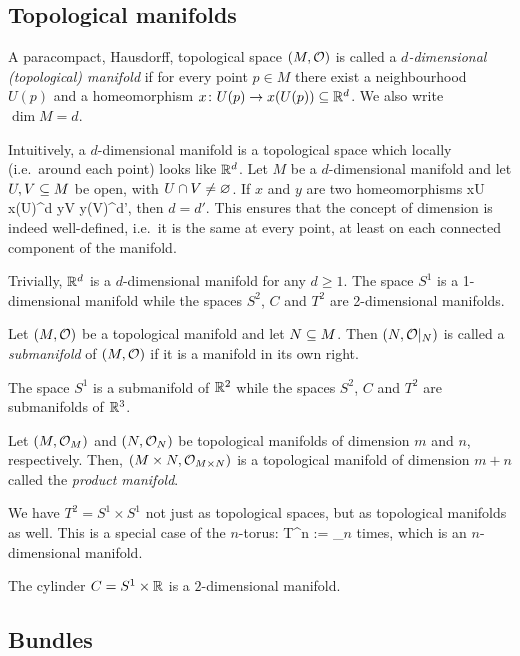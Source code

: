 \subsection{Topological manifolds}

\bd
A paracompact, Hausdorff, topological space $(M,\mathcal{O})$ is called a \emph{$d$-dimensional (topological) manifold} if for every point $p\in M$ there exist a neighbourhood $U(p)$ and a homeomorphism $x\colon U(p) \to x(U(p)) \subseteq \mathbb{R}^d$. We also write $\dim M = d$.
\ed

Intuitively, a $d$-dimensional manifold is a topological space which locally (i.e.\ around each point) looks like $\mathbb{R}^d$.
\bp
Let $M$ be a $d$-dimensional manifold and let $U,V\subseteq M$ be open, with $U\cap V \neq \varnothing$. If $x$ and $y$ are two homeomorphisms
\bse
x\cl U \to x(U)\se \R^d \qquad {}\qquad y\cl V \to y(V)\se\R^{d'},
\ese
then $d=d'$.
\ep
This ensures that the concept of dimension is indeed well-defined, i.e.\ it is the same at every point, at least on each connected component of the manifold.

\be
Trivially, $\mathbb{R}^d$ is a $d$-dimensional manifold for any $d \geq 1$. The space $S^1$ is a 1-dimensional manifold while the spaces $S^2$, $C$ and $T^2$ are 2-dimensional manifolds.
\ee

\bd
Let $(M,\mathcal{O})$ be a topological manifold and let $N \subseteq M$. Then $(N,\mathcal{O}|_N)$ is called a \emph{submanifold} of $(M,\mathcal{O})$ if it is a manifold in its own right.
\ed

\be
The space $S^1$ is a submanifold of $\mathbb{R}^2$ while the spaces $S^2$, $C$ and $T^2$ are submanifolds of $\mathbb{R}^3$. 
\ee

\bd
Let $(M,\mathcal{O}_M)$ and $(N,\mathcal{O}_N)$ be topological manifolds of dimension $m$ and $n$, respectively. Then, $(M\times N,\mathcal{O}_{M\times N})$ is a topological manifold of dimension $m+n$ called the \emph{product manifold}.
\ed

\be
We have $T^2=S^1\times S^1$ not just as topological spaces, but as topological manifolds as well. This is a special case of the $n$-torus:
\bse
T^n := _{\t{$n$ times}},
\ese
which is an $n$-dimensional manifold.
\ee

\be
The cylinder $C=S^1\times \mathbb{R}$ is a $2$-dimensional manifold.
\ee

\subsection{Bundles}

